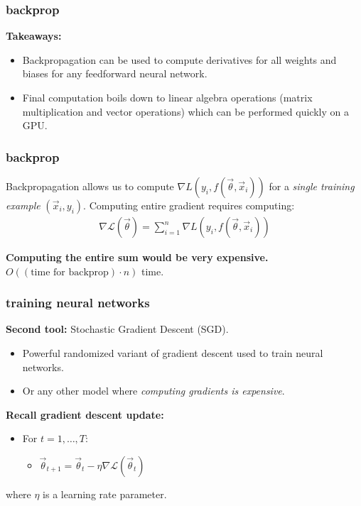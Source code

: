 \documentclass[handout,compress]{beamer}
\begin{document}
	\begin{frame}
		\frametitle{backprop}
		\textbf{Takeaways:}
		\begin{itemize}
			\item Backpropagation can be used to compute derivatives for all weights and biases for any feedforward neural network.
			\item Final computation boils down to linear algebra operations (matrix multiplication and vector operations) which can be performed quickly on a GPU.
		\end{itemize}
	\end{frame}

	\begin{frame}
	\frametitle{backprop}
	Backpropagation allows us to compute $\nabla L\left(y_i,f(\vec{\theta}, \vec{x}_i)\right)$ for a \emph{single training example} $(\vec{x}_i, y_i)$. Computing entire gradient requires computing:
	\begin{align*}
	\nabla \mathcal{L}(\vec{\theta}) = \sum_{i=1}^n \nabla L\left(y_i,f(\vec{\theta},\vec{x}_i)\right)
	\end{align*}
	\begin{center}
		\textbf{Computing the entire sum would be very expensive.}
		$O\left((\text{time for backprop})\cdot n\right)$ time.
	\end{center}
\end{frame}
	
	\begin{frame}
		\frametitle{training neural networks}
		\textbf{Second tool:} Stochastic Gradient Descent (SGD).
		\begin{itemize}
			\item Powerful {randomized} variant of gradient descent used to train neural networks. \item Or any other model where \emph{computing gradients is expensive}.
		\end{itemize}
		\vspace{2em}
		\textbf{Recall gradient descent update:}
		\begin{itemize}
			\item For $t = 1, \ldots, T$:
			\begin{itemize}
				\item $\vec{\theta}_{t+1} = \vec{\theta}_{t} - \eta \nabla \mathcal{L}(\vec{\theta}_t)$
			\end{itemize}
		\end{itemize}
		where $\eta$ is a learning rate parameter. 
	\end{frame}
	
\end{document}
